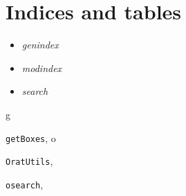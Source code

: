 \documentclass[letterpaper,10pt,english]{sphinxmanual}
\begin{document}
\chapter{Indices and tables}
\label{index:indices-and-tables}\begin{itemize}
\item {} 
\emph{genindex}

\item {} 
\emph{modindex}

\item {} 
\emph{search}

\end{itemize}


\renewcommand{\indexname}{Python Module Index}
\begin{theindex}
\def\bigletter#1{{\Large\sffamily#1}\nopagebreak\vspace{1mm}}
\bigletter{g}
\item {\texttt{getBoxes}}, \pageref{code:module-getBoxes}
\indexspace
\bigletter{o}
\item {\texttt{OratUtils}}, \pageref{code:module-OratUtils}
\item {\texttt{osearch}}, \pageref{code:module-osearch}
\end{theindex}

\renewcommand{\indexname}{Index}
\printindex
\end{document}
